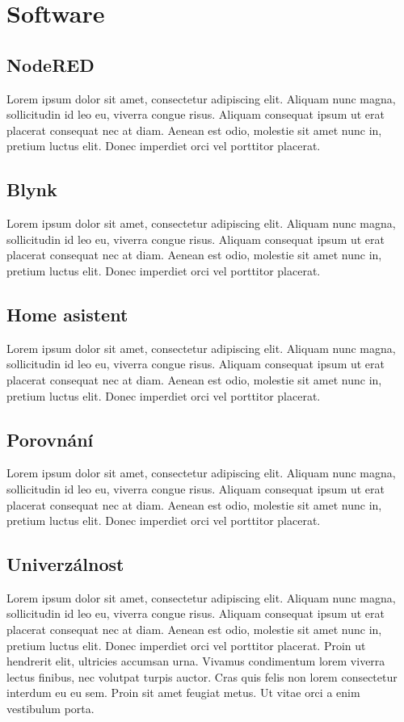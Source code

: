 \newpage

\section{Software}



\subsection{NodeRED}
Lorem ipsum dolor sit amet, consectetur adipiscing elit.
Aliquam nunc magna, sollicitudin id leo eu, viverra congue risus.
Aliquam consequat ipsum ut erat placerat consequat nec at diam. 
Aenean est odio, molestie sit amet nunc in, pretium luctus elit. 
Donec imperdiet orci vel porttitor placerat. 


\subsection{Blynk}
Lorem ipsum dolor sit amet, consectetur adipiscing elit.
Aliquam nunc magna, sollicitudin id leo eu, viverra congue risus.
Aliquam consequat ipsum ut erat placerat consequat nec at diam. 
Aenean est odio, molestie sit amet nunc in, pretium luctus elit. 
Donec imperdiet orci vel porttitor placerat. 


\subsection{Home asistent}
Lorem ipsum dolor sit amet, consectetur adipiscing elit.
Aliquam nunc magna, sollicitudin id leo eu, viverra congue risus.
Aliquam consequat ipsum ut erat placerat consequat nec at diam. 
Aenean est odio, molestie sit amet nunc in, pretium luctus elit. 
Donec imperdiet orci vel porttitor placerat. 




\subsection{Porovnání}
Lorem ipsum dolor sit amet, consectetur adipiscing elit.
Aliquam nunc magna, sollicitudin id leo eu, viverra congue risus.
Aliquam consequat ipsum ut erat placerat consequat nec at diam. 
Aenean est odio, molestie sit amet nunc in, pretium luctus elit. 
Donec imperdiet orci vel porttitor placerat. 








\subsection{Univerzálnost}
Lorem ipsum dolor sit amet, consectetur adipiscing elit.
Aliquam nunc magna, sollicitudin id leo eu, viverra congue risus.
Aliquam consequat ipsum ut erat placerat consequat nec at diam. 
Aenean est odio, molestie sit amet nunc in, pretium luctus elit. 
Donec imperdiet orci vel porttitor placerat. 
Proin ut hendrerit elit, ultricies accumsan urna. 
Vivamus condimentum lorem viverra lectus finibus, nec volutpat turpis auctor.
Cras quis felis non lorem consectetur interdum eu eu sem. 
Proin sit amet feugiat metus. 
Ut vitae orci a enim vestibulum porta. 
\newpage